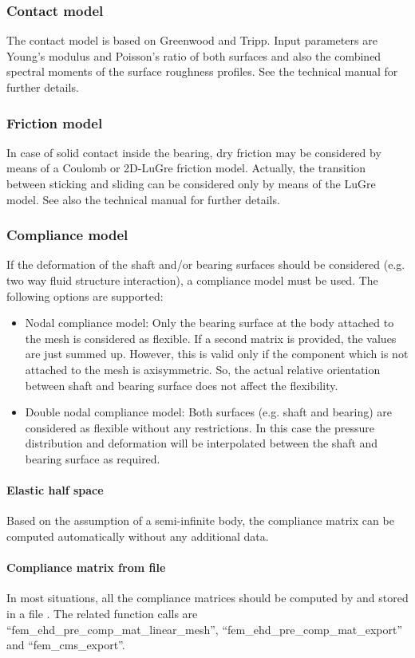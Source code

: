 \subsubsection{Contact model}
The contact model is based on Greenwood and Tripp\cite{Greenwood-1970}. Input parameters are Young's modulus and Poisson's ratio of both surfaces and also the combined spectral moments of the surface roughness profiles. See the technical manual for further details.
\subsubsection{Friction model}
In case of solid contact inside the bearing, dry friction may be considered by means of a Coulomb or 2D-LuGre friction model\cite{LuGre2D}. Actually, the transition between sticking and sliding can be considered only by means of the LuGre model. See also the technical manual for further details.
\subsubsection{Compliance model}
If the deformation of the shaft and/or bearing surfaces should be considered (e.g. two way fluid structure interaction), a compliance model must be used. The following options are supported:
\begin{itemize}
\item{Nodal compliance model:} Only the bearing surface at the body attached to the mesh is considered as flexible. If a second matrix is provided, the values are just summed up. However, this is valid only if the component which is not attached to the mesh is axisymmetric. So, the actual relative orientation between shaft and bearing surface does not affect the flexibility.
\item{Double nodal compliance model:} Both surfaces (e.g. shaft and bearing) are considered as flexible without any restrictions. In this case the pressure distribution and deformation will be interpolated between the shaft and bearing surface as required.
\end{itemize}
\paragraph{Elastic half space}
Based on the assumption of a semi-infinite body, the compliance matrix can be computed automatically without any additional data.
\paragraph{Compliance matrix from file}
In most situations, all the compliance matrices should be computed by  and stored in a file . The related function calls are ``fem\_ehd\_pre\_comp\_mat\_linear\_mesh'', ``fem\_ehd\_pre\_comp\_mat\_export'' and ``fem\_cms\_export''.

